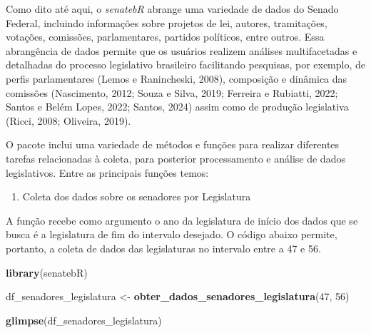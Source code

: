 \documentclass{article}
\newenvironment{Shaded}{\begin{snugshade}}{\end{snugshade}}
\newcommand{\DecValTok}[1]{\textcolor[rgb]{0.00,0.00,0.81}{#1}}
\newcommand{\FunctionTok}[1]{\textcolor[rgb]{0.13,0.29,0.53}{\textbf{#1}}}
\newcommand{\NormalTok}[1]{#1}
\newcommand{\OtherTok}[1]{\textcolor[rgb]{0.56,0.35,0.01}{#1}}
\providecommand{\tightlist}{%
  \setlength{\itemsep}{0pt}\setlength{\parskip}{0pt}}
\begin{document}
Como dito até aqui, o \emph{senatebR} abrange uma variedade de dados do
Senado Federal, incluindo informações sobre projetos de lei, autores,
tramitações, votações, comissões, parlamentares, partidos políticos,
entre outros. Essa abrangência de dados permite que os usuários realizem
análises multifacetadas e detalhadas do processo legislativo brasileiro
facilitando pesquisas, por exemplo, de perfis parlamentares (Lemos e
Ranincheski, 2008), composição e dinâmica das comissões (Nascimento,
2012; Souza e Silva, 2019; Ferreira e Rubiatti, 2022; Santos e Belém
Lopes, 2022; Santos, 2024) assim como de produção legislativa (Ricci,
2008; Oliveira, 2019).

O pacote inclui uma variedade de métodos e funções para realizar
diferentes tarefas relacionadas à coleta, para posterior processamento e
análise de dados legislativos. Entre as principais funções temos:

\begin{enumerate}
\def\labelenumi{\arabic{enumi}.}
\tightlist
\item
  Coleta dos dados sobre os senadores por Legislatura
\end{enumerate}

A função recebe como argumento o ano da legislatura de início dos dados
que se busca é a legislatura de fim do intervalo desejado. O código
abaixo permite, portanto, a coleta de dados das legislaturas no
intervalo entre a 47 e 56.

\begin{Shaded}
\begin{Highlighting}[]
\FunctionTok{library}\NormalTok{(senatebR)}
\end{Highlighting}
\end{Shaded}

\begin{Shaded}
\begin{Highlighting}[]
\NormalTok{df\_senadores\_legislatura }\OtherTok{\textless{}{-}} \FunctionTok{obter\_dados\_senadores\_legislatura}\NormalTok{(}\DecValTok{47}\NormalTok{, }\DecValTok{56}\NormalTok{)}

\FunctionTok{glimpse}\NormalTok{(df\_senadores\_legislatura)}
\end{Highlighting}
\end{Shaded}
\end{document}
